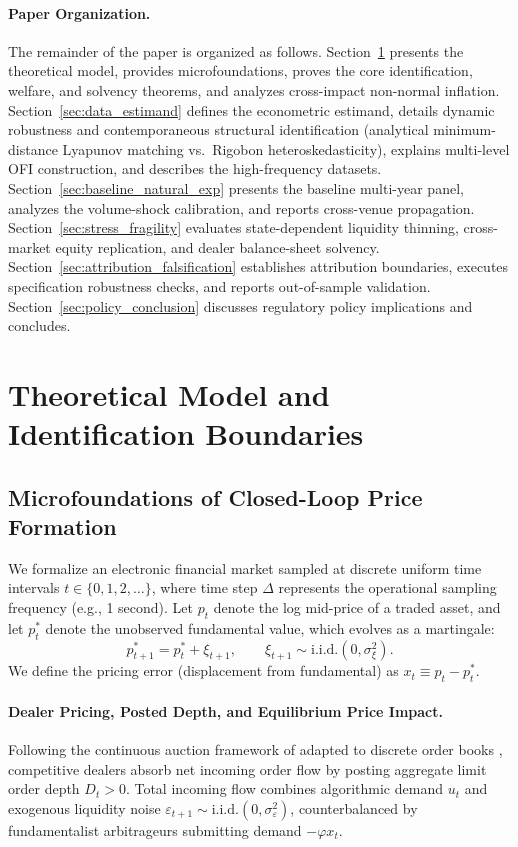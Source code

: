 \documentclass[12pt]{article}
\theoremstyle{definition}
\theoremstyle{remark}
\begin{document}
\paragraph{Paper Organization.}
The remainder of the paper is organized as follows. Section~\ref{sec:model} presents the theoretical model, provides microfoundations, proves the core identification, welfare, and solvency theorems, and analyzes cross-impact non-normal inflation. Section~\ref{sec:data_estimand} defines the econometric estimand, details dynamic robustness and contemporaneous structural identification (analytical minimum-distance Lyapunov matching vs.\ Rigobon heteroskedasticity), explains multi-level OFI construction, and describes the high-frequency datasets. Section~\ref{sec:baseline_natural_exp} presents the baseline multi-year panel, analyzes the volume-shock calibration, and reports cross-venue propagation. Section~\ref{sec:stress_fragility} evaluates state-dependent liquidity thinning, cross-market equity replication, and dealer balance-sheet solvency. Section~\ref{sec:attribution_falsification} establishes attribution boundaries, executes specification robustness checks, and reports out-of-sample validation. Section~\ref{sec:policy_conclusion} discusses regulatory policy implications and concludes.

\section{Theoretical Model and Identification Boundaries}
\label{sec:model}

\subsection{Microfoundations of Closed-Loop Price Formation}
We formalize an electronic financial market sampled at discrete uniform time intervals $t \in \{0, 1, 2, \dots\}$, where time step $\Delta$ represents the operational sampling frequency (e.g., 1 second). Let $p_t$ denote the log mid-price of a traded asset, and let $p_t^*$ denote the unobserved fundamental value, which evolves as a martingale:
\begin{equation}
p_{t+1}^* = p_t^* + \xi_{t+1}, \qquad \xi_{t+1} \sim \text{i.i.d.}(0, \sigma_\xi^2).
\label{eq:fundamental_process}
\end{equation}
We define the pricing error (displacement from fundamental) as $x_t \equiv p_t - p_t^*$.

\paragraph{Dealer Pricing, Posted Depth, and Equilibrium Price Impact.}
Following the continuous auction framework of \citet{kyle1985continuous} adapted to discrete order books \citep{glosten1985bid,hasbrouck1991,bouchaud2004fluctuations}, competitive dealers absorb net incoming order flow by posting aggregate limit order depth $D_t > 0$. Total incoming flow combines algorithmic demand $u_t$ and exogenous liquidity noise $\varepsilon_{t+1} \sim \text{i.i.d.}(0, \sigma_\varepsilon^2)$, counterbalanced by fundamentalist arbitrageurs submitting demand $-\varphi x_t$.
\end{document}
